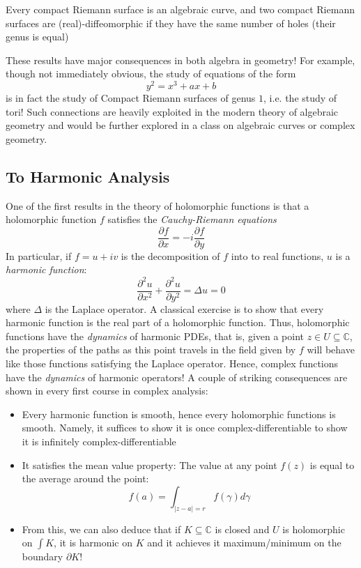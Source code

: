 \documentclass[oneside]{article}
\newcommand{\C}{\mathbb{C}}
\newcommand{\sse}{\subseteq}
\begin{document}
\begin{center}
    \addtolength{\leftskip}{2cm}  %
    \addtolength{\rightskip}{2cm} %
  Every compact Riemann surface is an algebraic curve, and two compact Riemann surfaces are (real)-diffeomorphic if
  they have the same number of holes (their genus is equal)
\end{center}

These results have major consequences in both algebra in geometry! For example, though not immediately
obvious, the study of equations of the form
\[
  y^2 = x^3 + ax + b
\]
is in fact the study of Compact Riemann surfaces of genus $1$, i.e. the study of tori! Such connections are
heavily exploited in the modern theory of algebraic geometry and would be further explored in a class on
algebraic curves or complex geometry.


\subsection{To Harmonic Analysis}

One of the first results in the theory of holomorphic functions is that a holomorphic function $f$ satisfies
the \emph{Cauchy-Riemann equations}
\[
  \frac{\partial f}{\partial x} = - i\frac{\partial f}{\partial y}
\]
In particular, if $f = u+iv$ is the decomposition of $f$ into to real functions, $u$ is a \emph{harmonic
function}:
\[
  \frac{\partial^2 u}{\partial x^2} + \frac{\partial^2 u}{\partial y^2} = \Delta u = 0
\]
where $\Delta$ is the Laplace operator. A classical exercise is to show that every harmonic function is the
real part of a holomorphic function. Thus, holomorphic functions have the \emph{dynamics} of harmonic PDEs,
that is, given a point $z \in U \sse \C$, the properties of the paths as this point travels in the field given
by $f$ will behave like those functions satisfying the Laplace operator. Hence, complex functions have the
\emph{dynamics} of harmonic operators! A couple of striking consequences are shown in every first course in
complex analysis:

\begin{itemize}
  \item Every harmonic function is smooth, hence every holomorphic functions is smooth. Namely, it suffices to
    show it is once complex-differentiable to show it is infinitely complex-differentiable
  \item It satisfies the mean value property: The value at any point $f(z)$ is equal to the average around
    the point:
    \[
      f(a) = \int_{|z-a|=r} f(\gamma)d\gamma
    \]
  \item From this, we can also deduce that if $K \sse \C$ is closed and $U$ is holomorphic on $\int K$, it is
    harmonic on $K$ and it achieves it maximum/minimum on the boundary $\partial K$!
\end{itemize}
\end{document}
